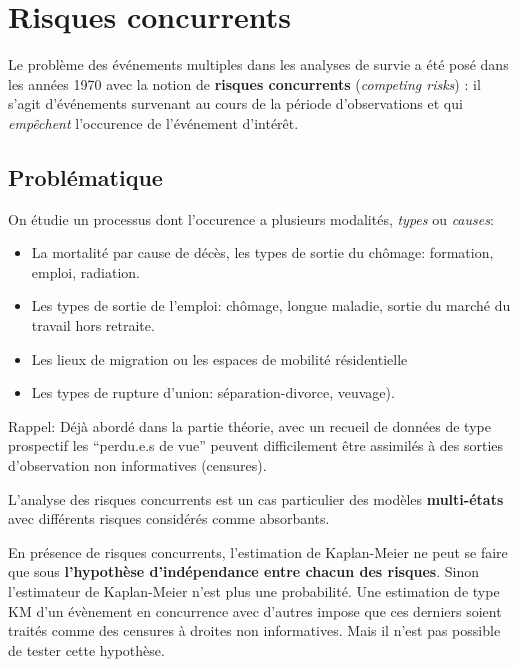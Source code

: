 \documentclass[
  12pt,
  letterpaper,
  DIV=11,
  numbers=noendperiod,
  onepage,
  openany]{scrreprt}
\providecommand{\tightlist}{%
  \setlength{\itemsep}{0pt}\setlength{\parskip}{0pt}}\usepackage{longtable,booktabs,array}
\begin{document}
\hypertarget{risques-concurrents}{%
\chapter{\texorpdfstring{\textbf{Risques
concurrents}}{Risques concurrents}}\label{risques-concurrents}}

Le problème des événements multiples dans les analyses de survie a été
posé dans les années 1970 avec la notion de \textbf{risques concurrents}
(\emph{competing risks}) : il s'agit d'événements survenant au cours de
la période d'observations et qui \emph{empêchent} l'occurence de
l'événement d'intérêt.

\hypertarget{probluxe9matique}{%
\section{Problématique}\label{probluxe9matique}}

On étudie un processus dont l'occurence a plusieurs modalités,
\emph{types} ou \emph{causes}:

\begin{itemize}
\tightlist
\item
  La mortalité par cause de décès, les types de sortie du chômage:
  formation, emploi, radiation.
\item
  Les types de sortie de l'emploi: chômage, longue maladie, sortie du
  marché du travail hors retraite.
\item
  Les lieux de migration ou les espaces de mobilité résidentielle
\item
  Les types de rupture d'union: séparation-divorce, veuvage).
\end{itemize}

Rappel: Déjà abordé dans la partie théorie, avec un recueil de données
de type prospectif les ``perdu.e.s de vue'' peuvent difficilement être
assimilés à des sorties d'observation non informatives (censures).

L'analyse des risques concurrents est un cas particulier des modèles
\textbf{multi-états} avec différents risques considérés comme
absorbants.

En présence de risques concurrents, l'estimation de Kaplan-Meier ne peut
se faire que sous \textbf{l'hypothèse d'indépendance entre chacun des
risques}. Sinon l'estimateur de Kaplan-Meier n'est plus une probabilité.
Une estimation de type KM d'un évènement en concurrence avec d'autres
impose que ces derniers soient traités comme des censures à droites non
informatives. Mais il n'est pas possible de tester cette hypothèse.
\end{document}
